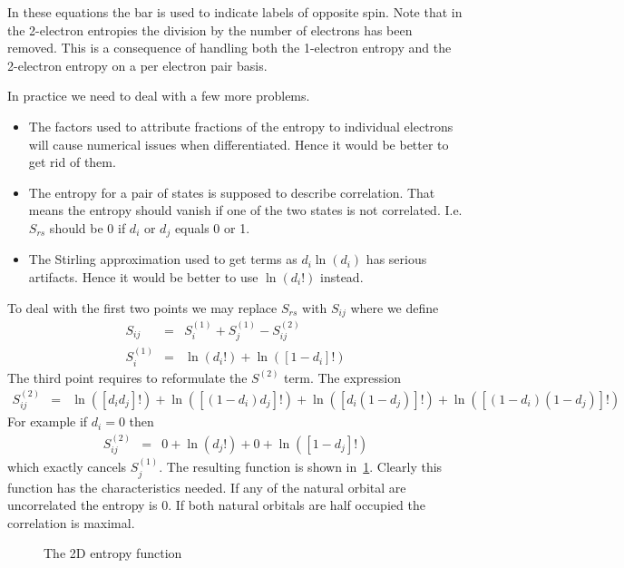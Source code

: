 \documentclass[pra]{revtex4-1}
\begin{document}
In these equations the bar is used to indicate labels of opposite spin. Note that in 
the 2-electron entropies the division by the number of electrons has been removed. 
This is a consequence of handling both the 1-electron entropy and the 2-electron 
entropy on a per electron pair basis.

In practice we need to deal with a few more problems. 
\begin{itemize}
\item The factors used to attribute fractions of the entropy to individual electrons
      will cause numerical issues when differentiated. Hence it would be better
      to get rid of them.
\item The entropy for a pair of states is supposed to describe correlation. That
      means the entropy should vanish if one of the two states is not correlated.
      I.e. $S_{rs}$ should be 0 if $d_i$ or $d_j$ equals 0 or 1.
\item The Stirling approximation used to get terms as $d_i\ln(d_i)$ has serious
      artifacts. Hence it would be better to use $\ln(d_i!)$ instead.
\end{itemize}
To deal with the first two points we may replace $S_{rs}$ with $S_{ij}$ where we 
define
\begin{eqnarray}
  S_{ij} &=& S_{i}^{(1)}+S_{j}^{(1)}-S_{ij}^{(2)} \\
  S_{i}^{(1)} &=& \ln(d_i!) + \ln([1-d_i]!) \label{Eq:S1}
\end{eqnarray}
The third point requires to reformulate the $S^{(2)}$ term. The expression
\begin{eqnarray}
  S_{ij}^{(2)} &=& \ln([d_id_j]!)+\ln([(1-d_i)d_j]!)
                +  \ln([d_i(1-d_j)]!)+\ln([(1-d_i)(1-d_j)]!) \label{Eq:S2}
\end{eqnarray}
For example if $d_i=0$ then
\begin{eqnarray}
  S_{ij}^{(2)} &=& 0+\ln(d_j!)+0+\ln([1-d_j]!)
\end{eqnarray}
which exactly cancels $S_{j}^{(1)}$. The resulting function is shown in~\ref{Fig1}.
Clearly this function has the characteristics needed. If any of the natural orbital
are uncorrelated the entropy is 0. If both natural orbitals are half occupied the
correlation is maximal.

\begin{figure}

\caption{The 2D entropy function}
\label{Fig1}
\end{figure}
\end{document}
